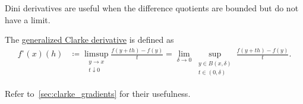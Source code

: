 \begin{definition}
\begin{defenum}
    Dini derivatives are useful when the difference quotients are bounded but do not have a limit.

    \item\label{def:derivatives/clarke}\cite[Section 10.1]{Clarke2013} The \uline{generalized Clarke derivative} is defined as
    \begin{align*}
      f^\circ(x)(h)
      &\coloneqq
      \limsup_{\substack{y \to x \\ t \downarrow 0}} \frac {f(y + th) - f(y)} t
      =
      \lim_{\delta \to 0} \sup_{\substack{y \in B(x, \delta) \\ t \in (0, \delta)}} \frac {f(y + th) - f(y)} t.
    \end{align*}

    Refer to~\cref{sec:clarke_gradients} for their usefulness.
  \end{defenum}
\end{definition}

